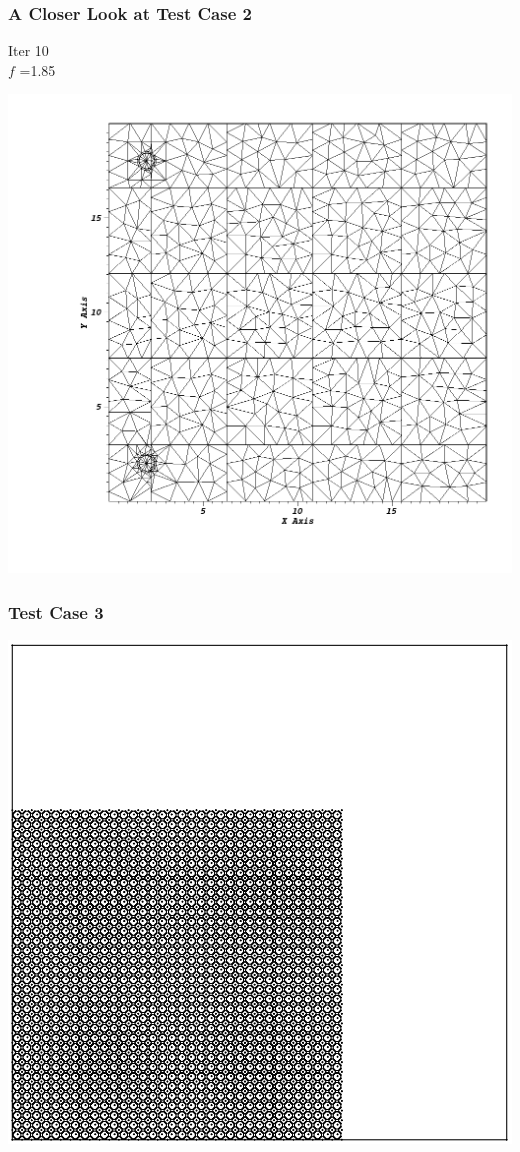 \documentclass[compress]{beamer}
\begin{document}
\begin{frame}[t]\frametitle{A Closer Look at Test Case 2}
\begin{minipage}{0.15\textwidth}
\begin{footnotesize}
Iter 10\\
$f$ =1.85
\end{footnotesize}
\end{minipage}
\begin{minipage}{0.8\textwidth}
\centering
\includegraphics[scale=0.22]{figures/sameside_after.png}
\end{minipage}
\end{frame}

\begin{frame}[t]\frametitle{Test Case 3}
\centering
\includegraphics[scale = 0.4]{figures/lattice-12-shifted-eps-converted-to.pdf}
\end{frame}
\end{document}
